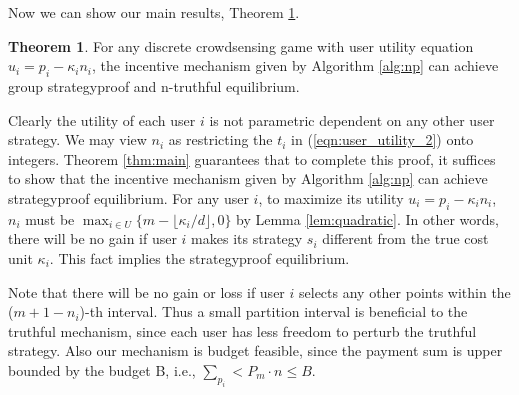 \documentclass[conference]{IEEEtran}
\theoremstyle{definition}
\newtheorem{theorem}{Theorem}
\begin{document}
{Now we can show our main results, Theorem \ref{thm:discrete}.
\begin{theorem}
\label{thm:discrete}
For any discrete crowdsensing game with user utility equation $u_i = p_i - \kappa_in_i$, the incentive mechanism given by Algorithm \ref{alg:np} can achieve group strategyproof and n-truthful equilibrium.
\end{theorem}
\begin{IEEEproof}
Clearly the utility of each user $i$ is not parametric dependent on any other user strategy. We may view $n_i$ as restricting the $t_i$ in (\ref{eqn:user_utility_2}) onto integers. %
Theorem \ref{thm:main} guarantees that to complete this proof, it suffices to show that the incentive mechanism given by Algorithm \ref{alg:np} can achieve strategyproof equilibrium. For any user $i$, to maximize its utility $u_i = p_i - \kappa_in_i$, $n_i$ must be $\max_{i\in U}\{m-\lfloor \kappa_i/d \rfloor, 0\}$ by Lemma \ref{lem:quadratic}. In other words, there will be no gain if user $i$ makes its strategy $s_i$ different from the true cost unit $\kappa_i$. This fact implies the strategyproof equilibrium.
\end{IEEEproof}
}
{\color{black}Note that there will be no gain or loss if user $i$ selects any other points within the ($m+1-n_i$)-th interval. Thus a small partition interval is beneficial to the truthful mechanism, since each user has less freedom to perturb the truthful strategy. }
{\color{blue}Also our mechanism is budget feasible, since the payment sum is upper bounded by the budget B, i.e., $\sum_{p_i} < P_m\cdot n \leq B$.}
\end{document}
